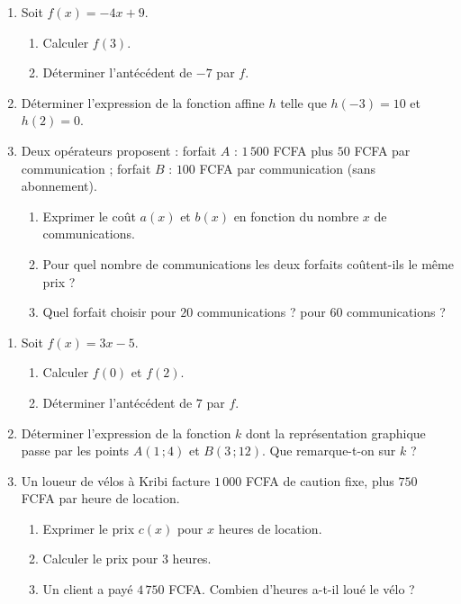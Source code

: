 \begin{enumerate}[label=\arabic*)]
\item Soit $f(x)=-4x+9$.
\begin{enumerate}[label=\alph*)]
\item Calculer $f(3)$.
\item Déterminer l'antécédent de $-7$ par $f$.
\end{enumerate}
\item Déterminer l'expression de la fonction affine $h$ telle que $h(-3)=10$ et $h(2)=0$.
\item Deux opérateurs proposent : forfait $A$ : $1\,500$ FCFA plus $50$ FCFA par
communication ; forfait $B$ : $100$ FCFA par communication (sans abonnement).
\begin{enumerate}[label=\alph*)]
\item Exprimer le coût $a(x)$ et $b(x)$ en fonction du nombre $x$ de communications.
\item Pour quel nombre de communications les deux forfaits coûtent-ils le même prix ?
\item Quel forfait choisir pour $20$ communications ? pour $60$ communications ?
\end{enumerate}
\end{enumerate}

\begin{enumerate}[label=\arabic*)]
\item Soit $f(x)=3x-5$.
\begin{enumerate}[label=\alph*)]
\item Calculer $f(0)$ et $f(2)$.
\item Déterminer l'antécédent de $7$ par $f$.
\end{enumerate}
\item Déterminer l'expression de la fonction $k$ dont la représentation graphique passe
par les points $A(1\,;4)$ et $B(3\,;12)$. Que remarque-t-on sur $k$ ?
\item Un loueur de vélos à Kribi facture $1\,000$ FCFA de caution fixe, plus $750$ FCFA
par heure de location.
\begin{enumerate}[label=\alph*)]
\item Exprimer le prix $c(x)$ pour $x$ heures de location.
\item Calculer le prix pour $3$ heures.
\item Un client a payé $4\,750$ FCFA. Combien d'heures a-t-il loué le vélo ?
\end{enumerate}
\end{enumerate}

